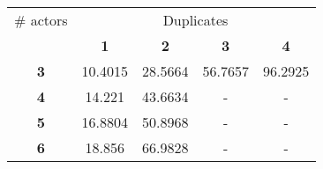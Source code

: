 \begin{tabular}{ | c | c | c | c | c | }
\hline
\# actors & \multicolumn{4}{|c|}{Duplicates} \\ \cline{2-5}
 & {\bf1} & {\bf2} & {\bf3} & {\bf4} \\ \hline
{\bf 3} & 10.4015 & 28.5664 & 56.7657 & 96.2925 \\ \hline
{\bf 4} & 14.221 & 43.6634 & - & - \\ \hline
{\bf 5} & 16.8804 & 50.8968 & - & - \\ \hline
{\bf 6} & 18.856 & 66.9828 & - & - \\ \hline
\end{tabular}